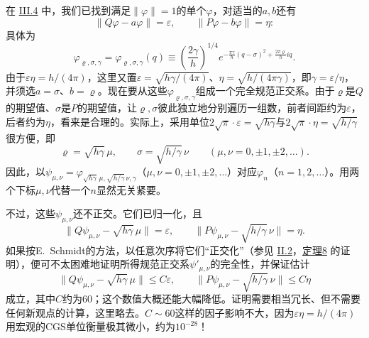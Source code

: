 \documentclass[fontsize=13pt,twoside,openany,headings=normal,parskip=false,bookmarkpackage=false,DIV=calc]{scrbook}
\begin{document}
在 \hyperref[sec:III.4]{III.4} 中，我们已找到满足$\|\varphi\|=1$的单个$\varphi$，对适当的$a,\allowbreak b$还有
\[
\|Q\varphi-a\varphi\|=\varepsilon,\qquad\|P\varphi-b\varphi\|=\eta:
\]
具体为
\[
\varphi_{\varrho,\sigma,\gamma}
=\varphi_{\varrho,\sigma,\gamma}(q)
\equiv\left(\frac{2\gamma}{h}\right)^{1/4}
 e^{-\frac{\pi\gamma}{h}(q-\sigma)^2+\frac{2\pi\varrho}{h}iq}.
\]
由于$\varepsilon\eta=h/(4\pi)$，这里又置$\varepsilon=\sqrt{h\gamma/(4\pi)}$、$\eta=\sqrt{h/(4\pi\gamma)}$，即$\gamma=\varepsilon/\eta$，并须选$a=\sigma$、$b=\varrho$。现在要从这些$\varphi_{\varrho,\allowbreak \sigma,\allowbreak \gamma}$组成一个完全规范正交系。\hypertarget{origpage-217}{}\label{origpage-217}由于$\varrho$是$Q$的期望值、$\sigma$是$P$的期望值，让$\varrho,\allowbreak \sigma$彼此独立地分别遍历一组数，前者间距约为$\varepsilon$，后者约为$\eta$，看来是合理的。实际上，采用单位$2\sqrt\pi\cdot\varepsilon=\sqrt{h\gamma}$与$2\sqrt\pi\cdot\eta=\sqrt{h/\gamma}$很方便，即
\[
\varrho=\sqrt{h\gamma}\,\mu,\qquad\sigma=\sqrt{h/\gamma}\,\nu
\qquad(\mu,\nu=0,\pm1,\pm2,\ldots).
\]
因此，以$\psi_{\mu,\allowbreak \nu}=\varphi_{\sqrt{h\gamma}\,\mu,\allowbreak \sqrt{h/\gamma}\,\nu,\allowbreak \gamma}$（$\mu,\allowbreak \nu=0,\allowbreak \pm1,\allowbreak \pm2,\allowbreak \ldots$）对应$\varphi_n$（$n=1,\allowbreak 2,\allowbreak \ldots$）。用两个下标$\mu,\allowbreak \nu$代替一个$n$显然无关紧要。

不过，这些$\psi_{\mu,\allowbreak \nu}$还不正交。它们已归一化，且
\[
\|Q\psi_{\mu,\nu}-\sqrt{h\gamma}\,\mu\|=\varepsilon,\qquad
\|P\psi_{\mu,\nu}-\sqrt{h/\gamma}\,\nu\|=\eta.
\]
如果按E.~Schmidt的方法，以任意次序将它们“正交化”（参见 \hyperref[sec:II.2]{II.2}，\CJKglue \hyperref[thm:II.8]{定理8} 的证明），便可不太困难地证明所得规范正交系$\psi'_{\mu,\allowbreak \nu}$的完全性，并保证估计
\[
\|Q\psi_{\mu,\nu}-\sqrt{h\gamma}\,\mu\|\leq C\varepsilon,\qquad
\|P\psi_{\mu,\nu}-\sqrt{h/\gamma}\,\nu\|\leq C\eta
\]
成立，其中$C$约为$60$；这个数值大概还能大幅降低。证明需要相当冗长、但不需要任何新观点的计算，这里略去。$C\sim60$这样的因子影响不大，因为$\varepsilon\eta=h/(4\pi)$用宏观的CGS单位衡量极其微小，约为$10^{-28}$！
\end{document}
